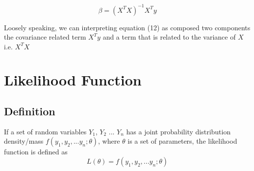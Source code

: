 \documentclass[12pt, oneside]{article}
\begin{document}
\begin{equation}
\beta=({X^T}{X})^{-1}{X^{T}}{y}
\end{equation}

Loosely speaking, we can interpreting equation (12) as composed two components the covariance related term $X^{T}y$ and a term that is related to the variance of $X$ i.e. ${X^T}{X}$


\section{Likelihood Function}
\subsection{Definition}
If a set of random variables $Y_1$, $Y_2$ ... $Y_n$ has a joint probability distribution density/mass $f(y_1, y_2, ...y_n;\theta)$, where $\theta$ is a set of parameters, the likelihood function is defined as 
\begin{equation}
L(\theta)=f(y_1, y_2, ...y_n; \theta)
\end{equation}
\end{document}
